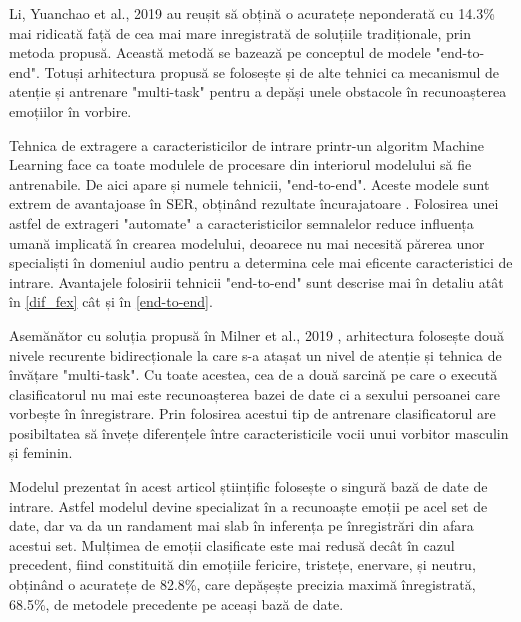 \documentclass[a4paper,12pt]{book}
\begin{document}
					Li, Yuanchao et al., 2019 \cite{yuan} au reușit să obțină o acuratețe neponderată cu 14.3\% mai ridicată față de cea mai mare inregistrată de soluțiile tradiționale, prin metoda propusă. Această metodă se bazează pe conceptul de modele "end-to-end". Totuși arhitectura propusă se folosește și de alte tehnici ca mecanismul de atenție și antrenare "multi-task" pentru a depăși unele obstacole în recunoașterea emoțiilor în vorbire. \par
					
					Tehnica de extragere a caracteristicilor de intrare printr-un algoritm Machine Learning face ca toate modulele de procesare din interiorul modelului să fie antrenabile. De aici apare și numele tehnicii, "end-to-end". Aceste modele sunt extrem de avantajoase în SER, obținând rezultate încurajatoare \cite{adieu,e2e}. Folosirea unei astfel de extrageri "automate" a caracteristicilor semnalelor reduce influența umană implicată în crearea modelului, deoarece nu mai necesită părerea unor specialiști în domeniul audio pentru a determina cele mai eficente caracteristici de intrare. Avantajele folosirii tehnicii "end-to-end" sunt descrise mai în detaliu atât în \ref{dif_fex} cât și în \ref{end-to-end}. \par
					
					Asemănător cu soluția propusă în Milner et al., 2019 \cite{multi-domain}, arhitectura folosește două nivele recurente bidirecționale la care s-a atașat un nivel de atenție și tehnica de  învățare "multi-task". Cu toate acestea, cea de a două sarcină pe care o execută clasificatorul nu mai este recunoașterea bazei de date ci a sexului persoanei care vorbește în înregistrare. Prin folosirea acestui tip de antrenare clasificatorul are posibiltatea să învețe diferențele între caracteristicile vocii unui vorbitor masculin și feminin. \par
					
					Modelul prezentat în acest articol științific folosește o singură bază de date de intrare. Astfel modelul devine specializat în a recunoaște emoții pe acel set de date, dar va da un randament mai slab în inferența pe înregistrări din afara acestui set. Mulțimea de emoții clasificate este mai redusă  decât în cazul precedent, fiind constituită din emoțiile fericire, tristețe, enervare, și neutru, obținând o acuratețe de 82.8\%, care depășește precizia maximă înregistrată, 68.5\%, de metodele precedente pe aceași bază de date.
\end{document}
